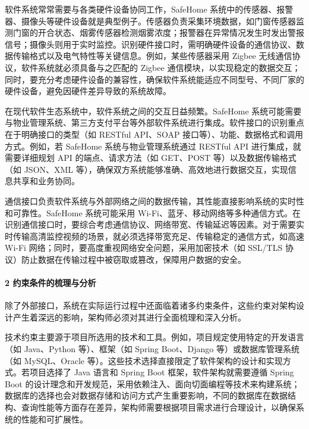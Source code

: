 软件系统常常需要与各类硬件设备协同工作，SafeHome 系统中的传感器、报警器、摄像头等硬件设备就是典型例子。传感器负责采集环境数据，如门窗传感器监测门窗的开合状态、烟雾传感器检测烟雾浓度；报警器在异常情况发生时发出警报信号；摄像头则用于实时监控。识别硬件接口时，需明确硬件设备的通信协议、数据传输格式以及电气特性等关键信息。例如，某些传感器采用 Zigbee 无线通信协议，软件系统就必须具备与之匹配的 Zigbee 通信模块，以实现稳定的数据交互；同时，要充分考虑硬件设备的兼容性，确保软件系统能适应不同型号、不同厂家的硬件设备，避免因硬件差异导致的系统故障。

在现代软件生态系统中，软件系统之间的交互日益频繁。SafeHome 系统可能需要与物业管理系统、第三方支付平台等外部软件系统进行集成。软件接口的识别重点在于明确接口的类型（如 RESTful API、SOAP 接口等）、功能、数据格式和调用方式。例如，若 SafeHome 系统与物业管理系统通过 RESTful API 进行集成，就需要详细规划 API 的端点、请求方法（如 GET、POST 等）以及数据传输格式（如 JSON、XML 等），确保双方系统能够准确、高效地进行数据交互，实现信息共享和业务协同。

通信接口负责软件系统与外部网络之间的数据传输，其性能直接影响系统的实时性和可靠性。SafeHome 系统可能采用 Wi-Fi、蓝牙、移动网络等多种通信方式。在识别通信接口时，要综合考虑通信协议、网络带宽、传输延迟等因素。对于需要实时传输高清监控视频的场景，就必须选择带宽充足、传输稳定的通信方式，如高速 Wi-Fi 网络；同时，要高度重视网络安全问题，采用加密技术（如 SSL/TLS 协议）防止数据在传输过程中被窃取或篡改，保障用户数据的安全。

\hypertarget{ux7ea6ux675fux6761ux4ef6ux7684ux68b3ux7406ux4e0eux5206ux6790}{%
\paragraph{2 约束条件的梳理与分析}\label{ux7ea6ux675fux6761ux4ef6ux7684ux68b3ux7406ux4e0eux5206ux6790}}

除了外部接口，系统在实际运行过程中还面临着诸多约束条件，这些约束对架构设计产生着深远的影响，架构师必须对其进行全面梳理和深入分析。

技术约束主要源于项目所选用的技术和工具。例如，项目规定使用特定的开发语言（如 Java、Python 等）、框架（如 Spring Boot、Django 等）或数据库管理系统（如 MySQL、Oracle 等）。这些技术选择直接限定了软件架构的设计和实现方式。若项目选择了 Java 语言和 Spring Boot 框架，软件架构就需要遵循 Spring Boot 的设计理念和开发规范，采用依赖注入、面向切面编程等技术来构建系统；数据库的选择也会对数据存储和访问方式产生重要影响，不同的数据库在数据结构、查询性能等方面存在差异，架构师需要根据项目需求进行合理设计，以确保系统的性能和可扩展性。

